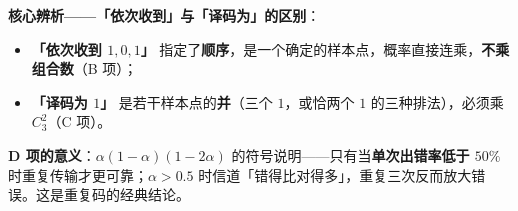 \begin{answer}
\begin{gktip}
\textbf{核心辨析——「依次收到」与「译码为」的区别}：
\begin{itemize}
\item \textbf{「依次收到 $1,0,1$」} 指定了\textbf{顺序}，是一个确定的样本点，概率直接连乘，\textbf{不乘组合数}（B 项）；
\item \textbf{「译码为 $1$」} 是若干样本点的\textbf{并}（三个 $1$，或恰两个 $1$ 的三种排法），必须乘 $C_3^{2}$（C 项）。
\end{itemize}

\textbf{D 项的意义}：$\alpha(1-\alpha)(1-2\alpha)$ 的符号说明——只有当\textbf{单次出错率低于 $50\%$} 时重复传输才更可靠；$\alpha>0.5$ 时信道「错得比对得多」，重复三次反而放大错误。这是重复码的经典结论。
\end{gktip}


\par\medskip

\end{answer}

